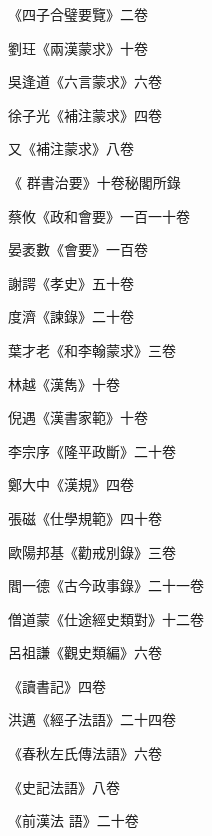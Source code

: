 \begin{pinyinscope}
 《四子合璧要覽》二卷



 劉玨《兩漢蒙求》十卷



 吳逢道《六言蒙求》六卷



 徐子光《補注蒙求》四卷



 又《補注蒙求》八卷



 《
 群書治要》十卷秘閣所錄



 蔡攸《政和會要》一百一十卷



 晏袤數《會要》一百卷



 謝諤《孝史》五十卷



 度濟《諫錄》二十卷



 葉才老《和李翰蒙求》三卷



 林越《漢雋》十卷



 倪遇《漢書家範》十卷



 李宗序《隆平政斷》二十卷



 鄭大中《漢規》四卷



 張磁《仕學規範》四十卷



 歐陽邦基《勸戒別錄》三卷



 閻一德《古今政事錄》二十一卷



 僧道蒙《仕途經史類對》十二卷



 呂祖謙《觀史類編》六卷



 《讀書記》四卷



 洪邁《經子法語》二十四卷



 《春秋左氏傳法語》六卷



 《史記法語》八卷



 《前漢法
 語》二十卷




\end{pinyinscope}
